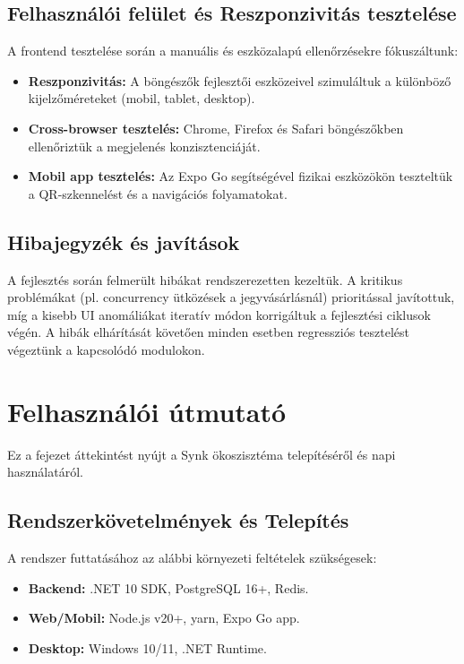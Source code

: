 \documentclass[colorlinks]{docs}
\theoremstyle{definition}
\theoremstyle{remark}
\begin{document}
\section{Felhasználói felület és Reszponzivitás tesztelése}
A frontend tesztelése során a manuális és eszközalapú ellenőrzésekre fókuszáltunk:
\begin{itemize}
    \item \textbf{Reszponzivitás:} A böngészők fejlesztői eszközeivel szimuláltuk a különböző kijelzőméreteket (mobil, tablet, desktop).
    \item \textbf{Cross-browser tesztelés:} Chrome, Firefox és Safari böngészőkben ellenőriztük a megjelenés konzisztenciáját.
    \item \textbf{Mobil app tesztelés:} Az Expo Go segítségével fizikai eszközökön teszteltük a QR-szkennelést és a navigációs folyamatokat.
\end{itemize}

\section{Hibajegyzék és javítások}
A fejlesztés során felmerült hibákat rendszerezetten kezeltük. A kritikus problémákat (pl. concurrency ütközések a jegyvásárlásnál) prioritással javítottuk, míg a kisebb UI anomáliákat iteratív módon korrigáltuk a fejlesztési ciklusok végén. A hibák elhárítását követően minden esetben regressziós tesztelést végeztünk a kapcsolódó modulokon.

\chapter{Felhasználói útmutató}
Ez a fejezet áttekintést nyújt a Synk ökoszisztéma telepítéséről és napi használatáról.

\section{Rendszerkövetelmények és Telepítés}
A rendszer futtatásához az alábbi környezeti feltételek szükségesek:
\begin{itemize}
    \item \textbf{Backend:} .NET 10 SDK, PostgreSQL 16+, Redis.
    \item \textbf{Web/Mobil:} Node.js v20+, yarn, Expo Go app.
    \item \textbf{Desktop:} Windows 10/11, .NET Runtime.
\end{itemize}
\end{document}
